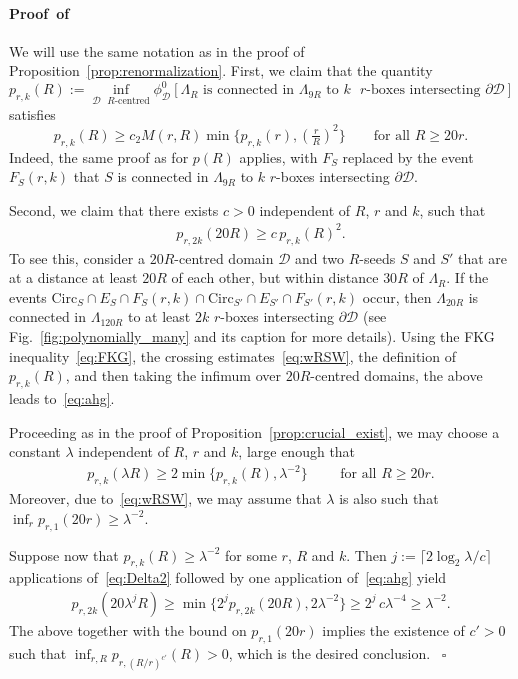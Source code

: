 \documentclass[a4paper,oneside,11pt]{article}
\numberwithin{equation}{section}
\numberwithin{equation}{section}
\numberwithin{equation}{section}
\newenvironment{proof}[1][\relax]%
  {\paragraph{Proof\ifx#1\relax\else~of #1\fi}}%
  {~\hfill$\square$\par\bigskip}
\newcommand{\calD}{\mathcal{D}}
\newcommand{\La}{\Lambda}
\newcommand{\Circ}{\mathrm{Circ}}
\begin{document}
\begin{proof}
We will use the same notation as in the proof of Proposition~\ref{prop:renormalization}.
First, we claim that the quantity
$$
p_{r  ,k}(R):=\inf_{\calD \text{ $R$-centred}}\phi_\calD^0[\Lambda_R\text{ is connected in $\Lambda_{9R}$ to $k$  $r  $-boxes intersecting }\partial\calD]
$$
satisfies
\begin{equation}\label{eq:ahgg}
	p_{r  ,k}(R)\ge c_2M(r,R)\min\{p_{r  ,k}(r),(\tfrac rR)^2\} \qquad \text{for all $R \geq 20r$}.
\end{equation}
Indeed, the same proof as for $p(R)$ applies, 
with $F_S$ replaced by the event $F_S(r  ,k)$ that $S$ is connected in $\La_{9R}$ to $k$ $r  $-boxes intersecting $\partial\calD$.

Second, we claim that there exists $c > 0$ independent of $R$, $r  $ and $k$, such that
\begin{align}\label{eq:ahg}
	p_{r  ,2k}(20R)\ge c\, p_{r  ,k}(R)^2.
\end{align}
To see this, consider a $20R$-centred domain $\calD$ and two $R$-seeds $S$ and $S'$ that are at a distance at least $20R$ of each other, 
but within distance $30R$ of $\La_R$.  
If the events $\Circ_S\cap E_S\cap F_S(r  ,k)\cap \Circ_{S'}\cap E_{S'}\cap F_{S'}(r  ,k)$ occur, 
then $\Lambda_{20R}$ is connected in $\Lambda_{120R}$ to at least $2k$ $r  $-boxes intersecting $\partial\calD$
(see Fig.~\ref{fig:polynomially_many} and its caption for more details). 
Using the FKG inequality~\eqref{eq:FKG}, the crossing estimates~\eqref{eq:wRSW}, the definition of $p_{r  ,k}(R)$, 
and then taking the infimum over $20R$-centred domains, the above leads to~\eqref{eq:ahg}. 

Proceeding as in the proof of Proposition~\ref{prop:crucial_exist}, 
we may choose a constant $\lambda$ independent of $R$, $r  $ and $k$,
large enough that 
\begin{align}\label{eq:Delta2}
	p_{r  ,k}(\lambda R)\ge 2\min\{ p_{r  ,k}(R), \lambda^{-2}\}\qquad \text{ for all $R \geq 20r$}.
\end{align}
Moreover, due to~\eqref{eq:wRSW},
 we may assume that $\lambda$ is also such that $\inf_r   p_{r  ,1}(20r  ) \geq \lambda^{-2}$.

Suppose now that 
$p_{r  ,k}(R) \geq \lambda^{-2}$ for some $r$, $R$ and $k$. 
Then $j:= \lceil 2 \log_2 \lambda/c\rceil $ applications of~\eqref{eq:Delta2} followed by one application of~\eqref{eq:ahg} yield
\begin{align*}
	p_{r  ,2k}(20 \lambda^j R)\ge \min\{2^{j} p_{r  ,2k}(20 R), 2\lambda^{-2}\} \ge 2^j \, c \lambda^{-4}\ge \lambda^{-2}.
\end{align*}
The above together with the bound on $p_{r  ,1}(20r)$ implies the existence of $c' > 0$ 
such that $\displaystyle \inf_{r, R} p_{r  , (R/r  )^{c'}}(R) > 0$, which is the desired conclusion. 
\end{proof}
\end{document}
